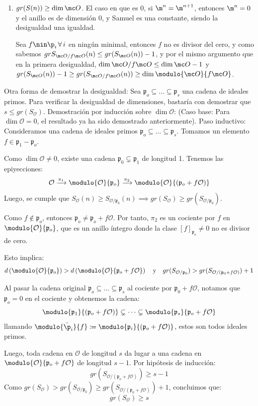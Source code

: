 \begin{dem}
\begin{enumerate}
    \item \underline{$gr(S(n)) \ge \dim \mc O$}. El caso en que es 0, si $\m^n = \m^{n+1}$, entonces $\m^n = 0$ y el anillo es de dimensi\'on 0, y Samuel es una constante, siendo la desigualdad una igualdad. 

    Sea $f \nin \p_i \, \forall \,i$ en ning\'un minimal, entonces $f$ no es divisor del cero, y como sabemos $gr S_{\mc O/f\mc O}(n) \le gr(S_{\mc O}(n))-1$, y por el mismo argumento que en la primera desigualdad, $\dim \mc O/f\mc O \le \dim \mc O - 1$ y $gr(S_{\mc O}(n))-1 \ge gr(S_{\mc O/f\mc O}(n)) \ge \dim  \modulo{\mc O}{f\mc O}$.
\end{enumerate}
Otra forma de demostrar la desigualdad: Sea $\mathfrak{p}_o \subseteq \dots \subseteq \mathfrak{p}_s$ una cadena de ideales primos. Para verificar la desigualdad de dimensiones, bastaría con demostrar que $s \le gr(S_{\mathcal{O}})$. Demostración por inducción sobre $\dim \mathcal{O}$: (Caso base: Para $\dim \mathcal{O} = 0$, el resultado ya ha sido demostrado anteriormente). Paso inductivo: Consideramos una cadena de ideales primos $\mathfrak{p}_o \subseteq \dots \subseteq \mathfrak{p}_s$. Tomamos un elemento $f \in \mathfrak{p}_1 - \mathfrak{p}_o$. 

Como $\dim \mathcal{O} \neq 0$, existe una cadena $\mathfrak{p}_0 \subsetneq \mathfrak{p}_1$ de longitud 1. Tenemos las epiyecciones:
$$\mathcal{O} \xrightarrow{\pi_1} \modulo{\mathcal{O}}{\mathfrak{p}_o} \xrightarrow{\pi_2} \modulo{\mathcal{O}}{(\mathfrak{p}_o + f\mathcal{O})}$$
Luego, se cumple que $S_{\mathcal{O}}(n) \ge S_{\mathcal{O}/\mathfrak{p}_0}(n) \implies gr(S_{\mathcal{O}}) \ge gr(S_{\mathcal{O}/\mathfrak{p}_0})$.

Como $f \nin \mathfrak{p}_o$, entonces $\mathfrak{p}_o \neq \mathfrak{p}_o + f\mathcal{O}$. Por tanto, $\pi_2$ es un cociente por $f$ en $\modulo{\mathcal{O}}{\mathfrak{p}_o}$, que es un anillo íntegro donde la clase $[f]_{\mathfrak{p}_o} \neq 0$ no es divisor de cero.

Esto implica:
$$d\left(\modulo{\mathcal{O}}{\mathfrak{p}_o}\right) > d\left(\modulo{\mathcal{O}}{\mathfrak{p}_o+ f\mathcal{O}}\right) \quad \text{y} \quad gr(S_{\mathcal{O}/\mathfrak{p}_0}) > gr(S_{\mathcal{O}/(\mathfrak{p}_0 + f\mathcal{O})}) + 1 \text{}$$

Al pasar la cadena original $\mathfrak{p}_o \subseteq \dots \subseteq \mathfrak{p}_s$ al cociente por $\mathfrak{p}_0 + f\mathcal{O}$, notamos que $\mathfrak{p}_o = 0$ en el cociente y obtenemos la cadena:
$$\modulo{\mathfrak{p}_1}{(\mathfrak{p}_o + f\mathcal{O})} \subsetneq \dots \subsetneq \modulo{\mathfrak{p}_s}{\mathfrak{p}_o + f\mathcal{O}}$$
llamando $\modulo{\bar \p_i }{f} \coloneqq \modulo{\mathfrak{p}_i}{(\mathfrak{p}_o + f\mathcal{O})}$, estos son todos ideales primos. 

Luego, toda cadena en $\mathcal{O}$ de longitud $s$ da lugar a una cadena en $\modulo{\mathcal{O}}{\mathfrak{p}_o + f\mathcal{O}}$ de longitud $s-1$. Por hipótesis de inducción:
$$gr(S_{\mathcal{O}/(\mathfrak{p}_o + f\mathcal{O})}) \ge s-1$$
Como $gr(S_{\mathcal{O}}) > gr(S_{\mathcal{O}/\mathfrak{p}_0}) \ge gr(S_{\mathcal{O}/(\mathfrak{p}_0 + f\mathcal{O})}) + 1$, concluimos que:$$ gr(S_{\mathcal{O}}) \ge s $$
\end{dem}
